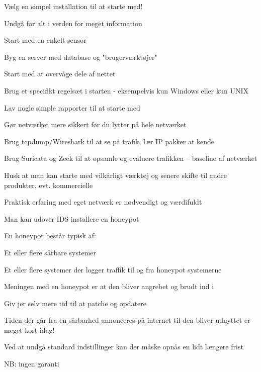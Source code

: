 \documentclass[Screen16to9,17pt]{foils}
\begin{document}

\begin{list1}
\item Vælg en simpel installation til at starte med!
\item Undgå for alt i verden for meget information
\begin{list2}
\item Start med en enkelt sensor
\item Byg en server med database og "brugerværktøjer"
\item Start med at overvåge dele af nettet
\item Brug et specifikt regelsæt i starten - eksempelvis kun Windows eller kun UNIX
\item Lav nogle simple rapporter til at starte med
\end{list2}
\item Gør netværket mere sikkert før du lytter på hele netværket
\item Brug tcpdump/Wireshark til at se på trafik, lær IP pakker at
  kende
\item Brug Suricata og Zeek til at opsamle og evaluere trafikken -- baseline af netværket
\begin{list2}
\item Husk at man kan starte med vilkårligt værktøj og senere skifte til andre
produkter, evt. kommercielle
\item Praktisk erfaring med eget netværk er nødvendigt og værdifuldt
\end{list2}
\end{list1}


\begin{list1}
\item Man kan udover IDS installere en honeypot
\item En honeypot består typisk af:
  \begin{list2}
    \item Et eller flere sårbare systemer
\item Et eller flere systemer der logger traffik til og fra honeypot
  systemerne
  \end{list2}
\item Meningen med en honeypot er at den bliver angrebet og brudt ind
  i
\end{list1}


\begin{list1}
\item Giv jer selv mere tid til at patche og opdatere
\item Tiden der går fra en sårbarhed annonceres på internet til den bliver
       udnyttet er meget kort idag!
\item Ved at undgå standard indstillinger kan der
       måske opnås en lidt længere frist
\item NB: ingen garanti
\end{list1}
\end{document}
